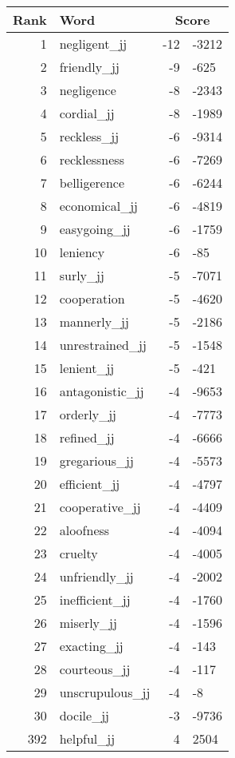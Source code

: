 \begin{longtable}[!htbp]{| rlr@{.}l |}
    \hline
    \textbf{Rank} & \textbf{Word} & \multicolumn{2}{c|}{\textbf{Score}} \\
    \hline
    \endhead
    1 & negligent\_jj & -12 & -3212 \\
    2 & friendly\_jj & -9 & -625 \\
    3 & negligence & -8 & -2343 \\
    4 & cordial\_jj & -8 & -1989 \\
    5 & reckless\_jj & -6 & -9314 \\
    6 & recklessness & -6 & -7269 \\
    7 & belligerence & -6 & -6244 \\
    8 & economical\_jj & -6 & -4819 \\
    9 & easygoing\_jj & -6 & -1759 \\
    10 & leniency & -6 & -85 \\
    11 & surly\_jj & -5 & -7071 \\
    12 & cooperation & -5 & -4620 \\
    13 & mannerly\_jj & -5 & -2186 \\
    14 & unrestrained\_jj & -5 & -1548 \\
    15 & lenient\_jj & -5 & -421 \\
    16 & antagonistic\_jj & -4 & -9653 \\
    17 & orderly\_jj & -4 & -7773 \\
    18 & refined\_jj & -4 & -6666 \\
    19 & gregarious\_jj & -4 & -5573 \\
    20 & efficient\_jj & -4 & -4797 \\
    21 & cooperative\_jj & -4 & -4409 \\
    22 & aloofness & -4 & -4094 \\
    23 & cruelty & -4 & -4005 \\
    24 & unfriendly\_jj & -4 & -2002 \\
    25 & inefficient\_jj & -4 & -1760 \\
    26 & miserly\_jj & -4 & -1596 \\
    27 & exacting\_jj & -4 & -143 \\
    28 & courteous\_jj & -4 & -117 \\
    29 & unscrupulous\_jj & -4 & -8 \\
    30 & docile\_jj & -3 & -9736 \\
    392 & helpful\_jj & 4 & 2504 \\

\end{longtable}
